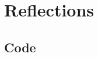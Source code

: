\documentclass[12pt,twosided]{report}
\begin{document}
\chapter{Reflections}
\label{chap:reflections}


\begin{appendices}

  
% 

% 

\chapter{Code}

\end{appendices}


\printbibliography[heading=bibintoc,title={References}]
\end{document}
